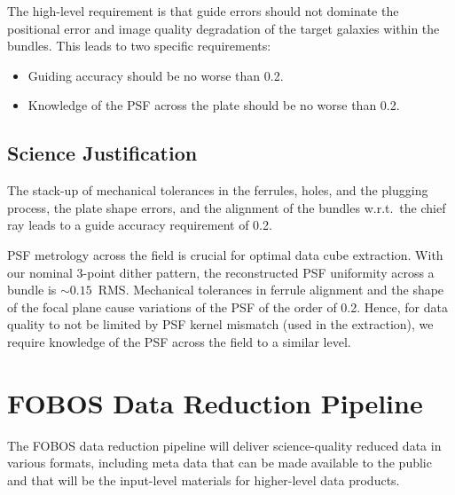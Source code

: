 \documentclass[preprint,11pt]{aastex}
\begin{document}
The high-level requirement is that guide errors should not dominate
the positional error and image quality degradation of the target
galaxies within the bundles. This leads to two specific requirements:

\begin{itemize}
\item Guiding accuracy should be no worse than 0.2\arcsec.
\item Knowledge of the PSF across the plate should be no worse than 0.2\arcsec.
\end{itemize}

\subsection{Science Justification}

The stack-up of mechanical tolerances in the ferrules, holes, and the
plugging process, the plate shape errors, and the alignment of the
bundles w.r.t.\ the chief ray leads to a guide accuracy requirement of
0.2\arcsec.

PSF metrology across the field is crucial for optimal data cube extraction. With
our nominal 3-point dither pattern, the reconstructed PSF uniformity across a 
bundle is $\sim 0.15$\arcsec\ RMS. Mechanical tolerances in ferrule alignment and  the
shape of the focal plane cause variations of the PSF of the order of 0.2\arcsec. 
Hence, for data quality to not be limited by PSF kernel mismatch (used in the
extraction),  we require knowledge of the PSF across the field to a similar level.

\section{FOBOS Data Reduction Pipeline} \label{sec:data_reduction_pipeline}

The FOBOS data reduction pipeline will deliver science-quality reduced
data in various formats, including meta data that can be made available
to the public and that will be the input-level materials for
higher-level data products. 
\end{document}
